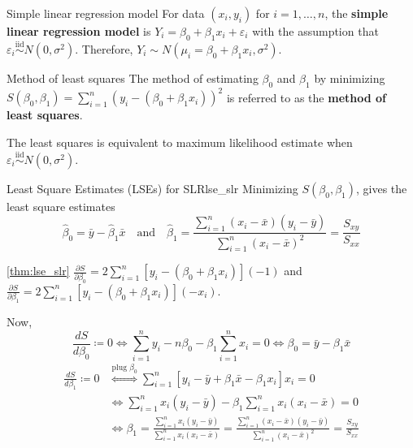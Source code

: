 \begin{Definition}{Simple linear regression model}{}
    For data $ (x_i,y_i) $ for $ i=1,\ldots,n $, the
    \textbf{simple linear regression model} is
    $ Y_i=\beta_0+\beta_1x_i+\varepsilon_i $
    with the assumption that
    $ \varepsilon_i\stackrel{\text{iid}}{\sim}N(0,\sigma^2) $.
    Therefore,
    $ Y_i\sim N(\mu_i=\beta_0+\beta_1x_i,\sigma^2) $.
\end{Definition}
\begin{Definition}{Method of least squares}{}
    The method of estimating $ \beta_0 $
    and $ \beta_1 $ by minimizing
    $ S(\beta_0,\beta_1)=\sum_{i=1}^{n}(y_i-(\beta_0+\beta_1x_i))^2 $
    is referred to as the \textbf{method of least squares}.
\end{Definition}
\begin{Remark}{}{}
    The least squares is equivalent to maximum likelihood estimate
    when $ \varepsilon_i\stackrel{\text{iid}}{\sim}N(0,\sigma^2) $.
\end{Remark}
\begin{Theorem}{Least Square Estimates (LSEs) for SLR}{lse_slr}
    Minimizing $ S(\beta_0,\beta_1) $, gives the
    least square estimates
    \[ \hat{\beta}_0=\bar{y}-\hat{\beta}_1\bar{x}\quad\text{and}
        \quad
        \hat{\beta}_1=
        \frac{\sum_{i=1}^{n} (x_i-\bar{x})(y_i-\bar{y})}{
            \sum_{i=1}^{n} (x_i-\bar{x})^2
        }=\frac{S_{xy}}{S_{xx}}   \]
\end{Theorem}
\begin{Proof}{\ref{thm:lse_slr}}{}
    $ \displaystyle \frac{\partial S}{\partial\beta_0}=2
        \sum\limits_{i=1}^{n} \left[ y_i-(\beta_0+\beta_1x_i) \right](-1)
    $ and $ \displaystyle
        \frac{\partial S}{\partial\beta_1}=2
        \sum\limits_{i=1}^{n} \left[ y_i-(\beta_0+\beta_1x_i) \right](-x_i) $.

    Now,
    \[ \frac{dS}{d\beta_0}\coloneq 0
        \iff \sum\limits_{i=1}^{n}y_i-n\beta_0-
        \beta_1 \sum\limits_{i=1}^{n} x_i=0
        \iff \beta_0=\bar{y}-\beta_1\bar{x} \]
    \begin{align*}
        \frac{dS}{d\beta_1}\coloneq 0
         & \stackrel{\text{plug }\beta_0}{\iff}
        \sum\limits_{i=1}^{n} \left[ y_i-\bar{y}+\beta_1\bar{x}-\beta_1 x_i \right]x_i=0 \\
         & \iff \sum\limits_{i=1}^{n} x_i(y_i-\bar{y})-\beta_1
        \sum\limits_{i=1}^{n} x_i(x_i-\bar{x})=0                                         \\
         & \iff \beta_1=\frac{\sum_{i=1}^{n} x_i(y_i-\bar{y})}{\sum_{i=1}^{n}
            x_i
            (x_i-\bar{x})}=\frac{\sum_{i=1}^{n}(x_i-\bar{x})
            (y_i-\bar{y})}{
            \sum_{i=1}^{n} (x_i-\bar{x})^2
        }=\frac{S_{xy}}{S_{xx}}
    \end{align*}
\end{Proof}
